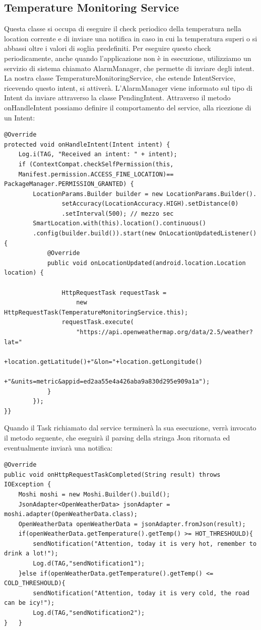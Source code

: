 \documentclass{article}
\begin{document}
\subsection{Temperature Monitoring Service}
Questa classe si occupa di eseguire il check periodico della temperatura nella location corrente e di inviare una notifica in caso in cui la temperatura superi o si abbassi oltre i valori di soglia predefiniti.
Per eseguire questo check periodicamente, anche quando l'applicazione non è in esecuzione, utilizziamo un servizio di sistema chiamato AlarmManager, che permette di inviare degli intent.
La nostra classe TemperatureMonitoringService, che estende IntentService, ricevendo questo intent, si attiverà. L'AlarmManager viene informato sul tipo di Intent da inviare attraverso la classe PendingIntent.
Attraverso il metodo onHandleIntent possiamo definire il comportamento del service, alla ricezione di un Intent:
\begin{lstlisting}
@Override
protected void onHandleIntent(Intent intent) {
    Log.i(TAG, "Received an intent: " + intent);
    if (ContextCompat.checkSelfPermission(this,
    Manifest.permission.ACCESS_FINE_LOCATION)== PackageManager.PERMISSION_GRANTED) {
        LocationParams.Builder builder = new LocationParams.Builder().
                setAccuracy(LocationAccuracy.HIGH).setDistance(0)
                .setInterval(500); // mezzo sec
        SmartLocation.with(this).location().continuous()
        .config(builder.build()).start(new OnLocationUpdatedListener() {
            @Override
            public void onLocationUpdated(android.location.Location location) {

                HttpRequestTask requestTask = 
                    new HttpRequestTask(TemperatureMonitoringService.this);
                requestTask.execute(
                    "https://api.openweathermap.org/data/2.5/weather?lat="
                    +location.getLatitude()+"&lon="+location.getLongitude()
                    +"&units=metric&appid=ed2aa55e4a426aba9a830d295e909a1a");
            }
        });
}}
\end{lstlisting}
\vspace{0,3cm}
Quando il Task richiamato dal service terminerà la sua esecuzione, verrà invocato il metodo seguente,
che eseguirà il parsing della stringa Json ritornata ed eventualmente inviarà una notifica:\\
\begin{lstlisting}
@Override
public void onHttpRequestTaskCompleted(String result) throws IOException {
    Moshi moshi = new Moshi.Builder().build();
    JsonAdapter<OpenWeatherData> jsonAdapter = moshi.adapter(OpenWeatherData.class);
    OpenWeatherData openWeatherData = jsonAdapter.fromJson(result);
    if(openWeatherData.getTemperature().getTemp() >= HOT_THRESHOULD){
        sendNotification("Attention, today it is very hot, remember to drink a lot!");
        Log.d(TAG,"sendNotification1");
    }else if(openWeatherData.getTemperature().getTemp() <= COLD_THRESHOULD){
        sendNotification("Attention, today it is very cold, the road can be icy!");
        Log.d(TAG,"sendNotification2");
}   }
\end{lstlisting}
\end{document}
